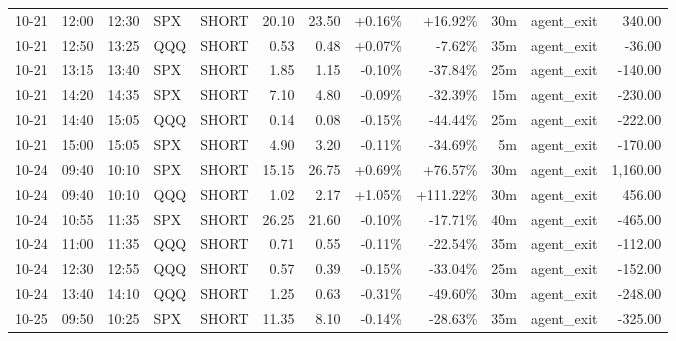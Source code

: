 \documentclass[11pt,a4paper,twoside]{article}
\begin{document}
\begin{center}
\begin{longtable}{>{\color{txtmain}}l l l l l r r r r r >{\color{txtmain}}l r}
10-21 & 12:00 & 12:30 & SPX & SHORT & 20.10 & 23.50 & \textcolor{wingreen}{+0.16\%} & \textcolor{wingreen}{+16.92\%} & 30m & agent\_exit & \textcolor{wingreen}{340.00} \\
10-21 & 12:50 & 13:25 & QQQ & SHORT & 0.53 & 0.48 & \textcolor{wingreen}{+0.07\%} & \textcolor{lossred}{-7.62\%} & 35m & agent\_exit & \textcolor{lossred}{-36.00} \\
10-21 & 13:15 & 13:40 & SPX & SHORT & 1.85 & 1.15 & \textcolor{lossred}{-0.10\%} & \textcolor{lossred}{-37.84\%} & 25m & agent\_exit & \textcolor{lossred}{-140.00} \\
10-21 & 14:20 & 14:35 & SPX & SHORT & 7.10 & 4.80 & \textcolor{lossred}{-0.09\%} & \textcolor{lossred}{-32.39\%} & 15m & agent\_exit & \textcolor{lossred}{-230.00} \\
10-21 & 14:40 & 15:05 & QQQ & SHORT & 0.14 & 0.08 & \textcolor{lossred}{-0.15\%} & \textcolor{lossred}{-44.44\%} & 25m & agent\_exit & \textcolor{lossred}{-222.00} \\
10-21 & 15:00 & 15:05 & SPX & SHORT & 4.90 & 3.20 & \textcolor{lossred}{-0.11\%} & \textcolor{lossred}{-34.69\%} & 5m & agent\_exit & \textcolor{lossred}{-170.00} \\
10-24 & 09:40 & 10:10 & SPX & SHORT & 15.15 & 26.75 & \textcolor{wingreen}{+0.69\%} & \textcolor{wingreen}{+76.57\%} & 30m & agent\_exit & \textcolor{wingreen}{1,160.00} \\
10-24 & 09:40 & 10:10 & QQQ & SHORT & 1.02 & 2.17 & \textcolor{wingreen}{+1.05\%} & \textcolor{wingreen}{+111.22\%} & 30m & agent\_exit & \textcolor{wingreen}{456.00} \\
10-24 & 10:55 & 11:35 & SPX & SHORT & 26.25 & 21.60 & \textcolor{lossred}{-0.10\%} & \textcolor{lossred}{-17.71\%} & 40m & agent\_exit & \textcolor{lossred}{-465.00} \\
10-24 & 11:00 & 11:35 & QQQ & SHORT & 0.71 & 0.55 & \textcolor{lossred}{-0.11\%} & \textcolor{lossred}{-22.54\%} & 35m & agent\_exit & \textcolor{lossred}{-112.00} \\
10-24 & 12:30 & 12:55 & QQQ & SHORT & 0.57 & 0.39 & \textcolor{lossred}{-0.15\%} & \textcolor{lossred}{-33.04\%} & 25m & agent\_exit & \textcolor{lossred}{-152.00} \\
10-24 & 13:40 & 14:10 & QQQ & SHORT & 1.25 & 0.63 & \textcolor{lossred}{-0.31\%} & \textcolor{lossred}{-49.60\%} & 30m & agent\_exit & \textcolor{lossred}{-248.00} \\
10-25 & 09:50 & 10:25 & SPX & SHORT & 11.35 & 8.10 & \textcolor{lossred}{-0.14\%} & \textcolor{lossred}{-28.63\%} & 35m & agent\_exit & \textcolor{lossred}{-325.00} \\

\end{longtable}
\end{center}
\end{document}
